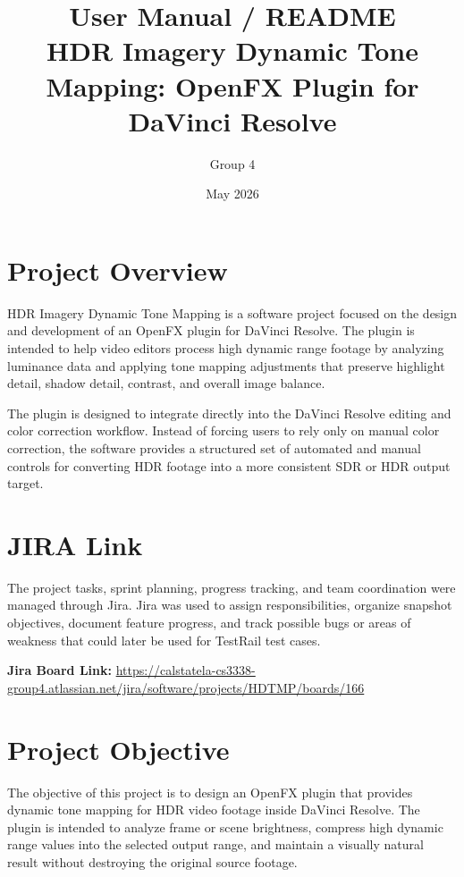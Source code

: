 \documentclass[11pt]{article}
\title{User Manual / README\\HDR Imagery Dynamic Tone Mapping: OpenFX Plugin for DaVinci Resolve}
\author{Group 4}
\date{May 2026}
\begin{document}
\maketitle


\section{Project Overview}

HDR Imagery Dynamic Tone Mapping is a software project focused on the design and development of an OpenFX plugin for DaVinci Resolve. The plugin is intended to help video editors process high dynamic range footage by analyzing luminance data and applying tone mapping adjustments that preserve highlight detail, shadow detail, contrast, and overall image balance.

The plugin is designed to integrate directly into the DaVinci Resolve editing and color correction workflow. Instead of forcing users to rely only on manual color correction, the software provides a structured set of automated and manual controls for converting HDR footage into a more consistent SDR or HDR output target.


\section{JIRA Link}

The project tasks, sprint planning, progress tracking, and team coordination were managed through Jira. Jira was used to assign responsibilities, organize snapshot objectives, document feature progress, and track possible bugs or areas of weakness that could later be used for TestRail test cases.

\textbf{Jira Board Link:} \url{https://calstatela-cs3338-group4.atlassian.net/jira/software/projects/HDTMP/boards/166}


\section{Project Objective}

The objective of this project is to design an OpenFX plugin that provides dynamic tone mapping for HDR video footage inside DaVinci Resolve. The plugin is intended to analyze frame or scene brightness, compress high dynamic range values into the selected output range, and maintain a visually natural result without destroying the original source footage.
\end{document}
